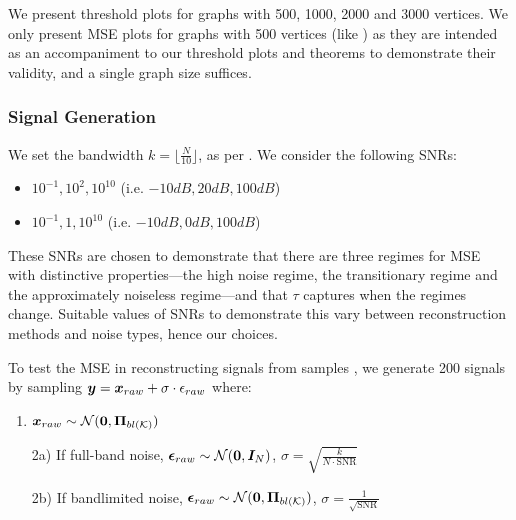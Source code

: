 We present threshold plots for graphs with 500, 1000, 2000 and 3000 vertices. We only present MSE plots for graphs with 500 vertices  {\color{black}  (like \cite[Fig 8]{bai2020fast})} as they are intended as an accompaniment to our threshold plots and theorems to demonstrate their validity, and a single graph size suffices. 

\subsubsection{ Signal Generation}
We set the bandwidth  $k = \lfloor \frac{N}{10} \rfloor$, as per \cite{bai2020fast}.  We consider the following SNRs:

\begin{itemize}
    \item{  $10^{-1}, 10^{2}, 10^{10}$ (i.e. $-10dB, 20dB, 100dB$)}
    \item{  $10^{-1}, 1, 10^{10}$ (i.e. $-10dB, 0dB, 100dB$)}
\end{itemize}
These SNRs are chosen to demonstrate that there are three regimes for MSE with distinctive properties---the high noise regime, the transitionary regime and the approximately noiseless regime---and that $\tau$ captures when the regimes change. Suitable values of SNRs to demonstrate this vary between reconstruction methods and noise types, hence our choices.

To test the MSE in reconstructing signals from samples , we generate 200 signals by sampling $\bm{y} = \bm{x}_{raw} + \sigma \cdot \epsilon_{raw}$ where:
\begin{enumerate}
    \item $\bm{x}_{raw} \sim \mathcal{N}(\bm{0}, \bm{\Pi}_{bl(\mathcal{K})})$ 
    \item[2a)] If full-band noise, $\bm{\epsilon}_{raw} \sim \mathcal{N}(\bm{0}, \bm{I}_{N})$, $\sigma = \sqrt{\frac{k}{{N \cdot\text{SNR}}}}$
    \item[2b)]  If bandlimited noise, $\vect{\epsilon}_{raw} \sim \mathcal{N}(\vect{0}, \projbl )$, $\sigma = \frac{1}{\sqrt{\text{SNR}}}$ 
\end{enumerate}

